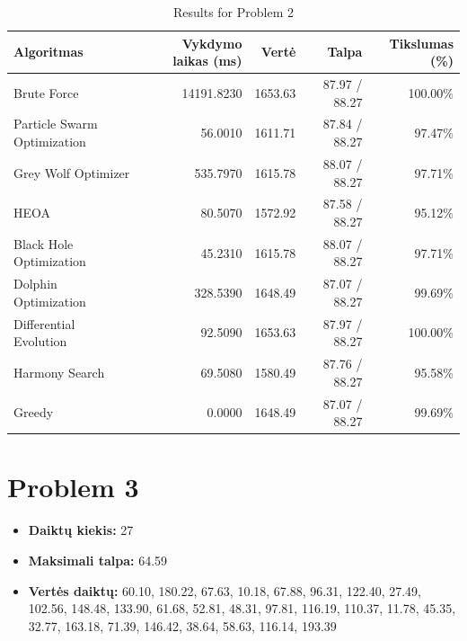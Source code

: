 \documentclass[a4paper,11pt]{article}
\begin{document}
\begin{table}[h!]
\centering
\begin{tabular}{lrrrr}
\toprule
\textbf{Algoritmas} & \textbf{Vykdymo laikas (ms)} & \textbf{Vertė} & \textbf{Talpa} & \textbf{Tikslumas (\%)} \\
\midrule
Brute Force & 14191.8230 & 1653.63 & 87.97 / 88.27 & 100.00\% \\
Particle Swarm Optimization & 56.0010 & 1611.71 & 87.84 / 88.27 & 97.47\% \\
Grey Wolf Optimizer & 535.7970 & 1615.78 & 88.07 / 88.27 & 97.71\% \\
HEOA & 80.5070 & 1572.92 & 87.58 / 88.27 & 95.12\% \\
Black Hole Optimization & 45.2310 & 1615.78 & 88.07 / 88.27 & 97.71\% \\
Dolphin Optimization & 328.5390 & 1648.49 & 87.07 / 88.27 & 99.69\% \\
Differential Evolution & 92.5090 & 1653.63 & 87.97 / 88.27 & 100.00\% \\
Harmony Search & 69.5080 & 1580.49 & 87.76 / 88.27 & 95.58\% \\
Greedy & 0.0000 & 1648.49 & 87.07 / 88.27 & 99.69\% \\
\bottomrule
\end{tabular}
\caption{Results for Problem 2}
\end{table}
\clearpage

\section*{Problem 3}
\begin{itemize}
    \item \textbf{Daiktų kiekis:} 27
    \item \textbf{Maksimali talpa:} 64.59
    \item \textbf{Vertės daiktų:} 60.10, 180.22, 67.63, 10.18, 67.88, 96.31, 122.40, 27.49, 102.56, 148.48, 133.90, 61.68, 52.81, 48.31, 97.81, 116.19, 110.37, 11.78, 45.35, 32.77, 163.18, 71.39, 146.42, 38.64, 58.63, 116.14, 193.39
\end{itemize}
\end{document}
